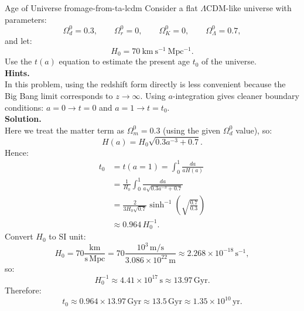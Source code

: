 \clearpage
\begin{example}{Age of Universe from}{age-from-ta-lcdm}
    Consider a flat $\Lambda$CDM-like universe with parameters:
    \[
        \Omega_d^0 = 0.3, \qquad \Omega_r^0 = 0, \qquad \Omega_K^0 = 0, \qquad \Omega_\Lambda^0 = 0.7,
    \]
    and let:
    \[
        H_0 = 70\ \mathrm{km\ s^{-1}\ Mpc^{-1}}.
    \]
    Use the $t(a)$ equation to estimate the present age $t_0$ of the universe. \\

    \bigskip\textbf{Hints.}\quad \\
    In this problem, using the redshift form directly is less convenient because the Big Bang limit corresponds to $z \to \infty$.
    Using $a$-integration gives cleaner boundary conditions: $a=0 \to t=0$ and $a=1 \to t=t_0$. \\

    \bigskip\textbf{Solution.}\quad \\
    Here we treat the matter term as $\Omega_m^0 = 0.3$ (using the given $\Omega_d^0$ value), so:
    \[
        H(a) = H_0\sqrt{0.3a^{-3} + 0.7}.
    \]
    Hence:
    \begin{align*}
        t_0 &= t(a=1) = \int_0^1 \frac{da}{aH(a)} \\
            &= \frac{1}{H_0}\int_0^1 \frac{da}{a\sqrt{0.3a^{-3}+0.7}} \\
            &= \frac{2}{3H_0\sqrt{0.7}}\sinh^{-1}\!\left(\sqrt{\frac{0.7}{0.3}}\right) \\
            &\approx 0.964\,H_0^{-1}.
    \end{align*}
    Convert $H_0$ to SI unit:
    \[
        H_0 = 70\frac{\mathrm{km}}{\mathrm{s\,Mpc}}
        = 70\frac{10^3\,\mathrm{m/s}}{3.086\times10^{22}\,\mathrm{m}}
        \approx 2.268\times10^{-18}\,\mathrm{s^{-1}},
    \]
    so:
    \[
        H_0^{-1} \approx 4.41\times10^{17}\,\mathrm{s} \approx 13.97\,\mathrm{Gyr}.
    \]
    Therefore:
    \[
        t_0 \approx 0.964\times 13.97\,\mathrm{Gyr} \approx 13.5\,\mathrm{Gyr}
        \approx 1.35\times10^{10}\,\mathrm{yr}.
    \]
\end{example}

